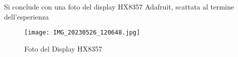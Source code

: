 Si conclude con una foto del display HX8357 Adafruit, scattata al termine dell'esperienza

\begin{figure}[H]
    \centering
    \texttt{[image: IMG\_20230526\_120648.jpg]}
    \caption{Foto del Display HX8357}
    \label{fig:IMG_20230526_120648}
\end{figure}